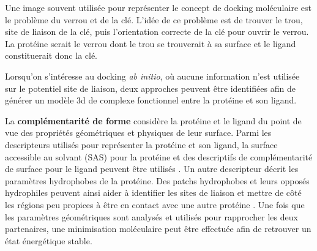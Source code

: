 Une image souvent utilisée pour représenter le concept de docking moléculaire est le problème du verrou et de la clé. L'idée de ce problème est de trouver le trou, site de liaison de la clé, puis l'orientation correcte de la clé pour ouvrir le verrou. La protéine serait le verrou dont le trou se trouverait à sa surface et le ligand constituerait donc la clé.


Lorsqu'on s'intéresse au docking \textit{ab initio}, où aucune information n'est utilisée sur le potentiel site de liaison, deux approches peuvent être identifiées afin de générer un modèle 3d de complexe fonctionnel entre la protéine et son ligand.

La \textbf{complémentarité de forme} considère la protéine et le ligand du point de vue des propriétés géométriques et physiques de leur surface. Parmi les descripteurs utilisés pour représenter la protéine et son ligand, la surface accessible au solvant (SAS) pour la protéine et des descriptifs de complémentarité de surface pour le ligand peuvent être utilisés \cite{shoichet1992molecular}. Un autre descripteur décrit les paramètres hydrophobes de la protéine. Des patchs hydrophobes et leurs opposés hydrophiles peuvent ainsi aider à identifier les sites de liaison et mettre de côté les régions peu propices à être en contact avec une autre protéine \cite{jones1996principles}. Une fois que les paramètres géométriques sont analysés et utilisés pour rapprocher les deux partenaires, une minimisation moléculaire peut être effectuée afin de retrouver un état énergétique stable.

